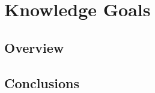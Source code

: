 
\renewcommand{\thechapter}{2}

\chapter{Knowledge Goals}

\section{Overview}

\section{Conclusions}
